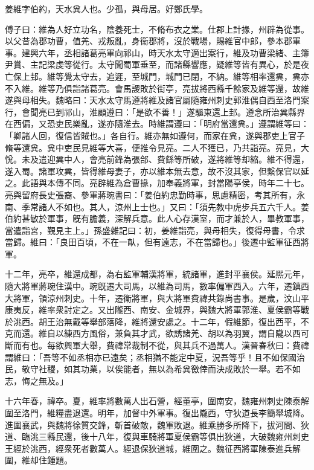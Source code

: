 
\begin{pinyinscope}
姜維字伯約，天水兾人也。少孤，與母居。好鄭氏學。

傅子曰：維為人好立功名，陰養死士，不脩布衣之業。仕郡上計掾，州辟為從事。以父昔為郡功曹，值羌、戎叛亂，身衞郡將，沒於戰場，賜維官中郎，參本郡軍事。建興六年，丞相諸葛亮軍向祁山，時天水太守適出案行，維及功曹梁緒、主簿尹賞、主記梁虔等從行。太守聞蜀軍垂至，而諸縣響應，疑維等皆有異心，於是夜亡保上邽。維等覺太守去，追遲，至城門，城門已閉，不納。維等相率還兾，兾亦不入維。維等乃俱詣諸葛亮。會馬謖敗於街亭，亮拔將西縣千餘家及維等還，故維遂與母相失。魏略曰：天水太守馬遵將維及諸官屬隨雍州刺史郭淮偶自西至洛門案行，會聞亮已到祁山，淮顧遵曰：「是欲不善！」遂驅東還上邽。遵念所治兾縣界在西偏，又恐吏民樂亂，遂亦隨淮去。時維謂遵曰：「明府當還兾。」遵謂維等曰：「卿諸人回，復信皆賊也。」各自行。維亦無如遵何，而家在兾，遂與郡吏上官子脩等還兾。兾中吏民見維等大喜，便推令見亮。二人不獲已，乃共詣亮。亮見，大恱。未及遣迎兾中人，會亮前鋒為張郃、費繇等所破，遂將維等却縮。維不得還，遂入蜀。諸軍攻兾，皆得維母妻子，亦以維本無去意，故不沒其家，但繫保官以延之。此語與本傳不同。亮辟維為倉曹掾，加奉義將軍，封當陽亭侯，時年二十七。亮與留府長史張裔、參軍蔣琬書曰：「姜伯約忠勤時事，思慮精密，考其所有，永南、季常諸人不如也。其人，涼州上士也。」又曰：「須先教中虎步兵五六千人。姜伯約甚敏於軍事，旣有膽義，深解兵意。此人心存漢室，而才兼於人，畢教軍事，當遣詣宮，覲見主上。」孫盛雜記曰：初，姜維詣亮，與母相失，復得母書，令求當歸。維曰：「良田百頃，不在一畒，但有遠志，不在當歸也。」後遷中監軍征西將軍。

十二年，亮卒，維還成都，為右監軍輔漢將軍，統諸軍，進封平襄侯。延熈元年，隨大將軍蔣琬住漢中。琬旣遷大司馬，以維為司馬，數率偏軍西入。六年，遷鎮西大將軍，領涼州刺史。十年，遷衞將軍，與大將軍費禕共錄尚書事。是歲，汶山平康夷反，維率衆討定之。又出隴西、南安、金城界，與魏大將軍郭淮、夏侯霸等戰於洮西。胡王治無戴等舉部落降，維將還安處之。十二年，假維節，復出西平，不克而還。維自以練西方風俗，兼負其才武，欲誘諸羌、胡以為羽翼，謂自隴以西可斷而有也。每欲興軍大舉，費禕常裁制不從，與其兵不過萬人。漢晉春秋曰：費禕謂維曰：「吾等不如丞相亦已遠矣；丞相猶不能定中夏，況吾等乎！且不如保國治民，敬守社稷，如其功業，以俟能者，無以為希兾徼倖而決成敗於一舉。若不如志，悔之無及。」

十六年春，禕卒。夏，維率將數萬人出石營，經董亭，圍南安，魏雍州刺史陳泰解圍至洛門，維糧盡退還。明年，加督中外軍事。復出隴西，守狄道長李簡舉城降。進圍襄武，與魏將徐質交鋒，斬首破敵，魏軍敗退。維乘勝多所降下，拔河間、狄道、臨洮三縣民還，後十八年，復與車騎將軍夏侯霸等俱出狄道，大破魏雍州刺史王經於洮西，經衆死者數萬人。經退保狄道城，維圍之。魏征西將軍陳泰進兵解圍，維却住鍾題。


\end{pinyinscope}
